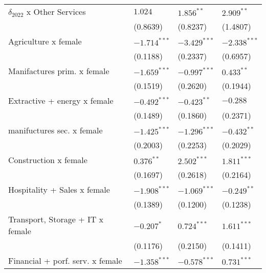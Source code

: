 \begin{tabular}{llll}
$\delta_{2022}$ x Other Services                   &            $1.024$ &       $1.856^{**}$ &       $2.909^{**}$ \\
                                                   &           (0.8639) &           (0.8237) &           (1.4807) \\
Agriculture x female                               &     $-1.714^{***}$ &     $-3.429^{***}$ &     $-2.338^{***}$ \\
                                                   &           (0.1188) &           (0.2337) &           (0.6957) \\
Manifactures prim. x female                        &     $-1.659^{***}$ &     $-0.997^{***}$ &       $0.433^{**}$ \\
                                                   &           (0.1519) &           (0.2620) &           (0.1944) \\
Extractive + energy x female                       &     $-0.492^{***}$ &      $-0.423^{**}$ &           $-0.288$ \\
                                                   &           (0.1489) &           (0.1860) &           (0.2371) \\
manifuctures sec. x female                         &     $-1.425^{***}$ &     $-1.296^{***}$ &      $-0.432^{**}$ \\
                                                   &           (0.2003) &           (0.2253) &           (0.2029) \\
Construction x female                              &       $0.376^{**}$ &      $2.502^{***}$ &      $1.811^{***}$ \\
                                                   &           (0.1697) &           (0.2618) &           (0.2164) \\
Hospitality + Sales x female                       &     $-1.908^{***}$ &     $-1.069^{***}$ &      $-0.249^{**}$ \\
                                                   &           (0.1389) &           (0.1200) &           (0.1238) \\
Transport, Storage + IT x female                   &         $-0.207^*$ &      $0.724^{***}$ &      $1.611^{***}$ \\
                                                   &           (0.1176) &           (0.2150) &           (0.1411) \\
Financial + porf. serv. x female                   &     $-1.358^{***}$ &     $-0.578^{***}$ &      $0.731^{***}$ \\

\end{tabular}
